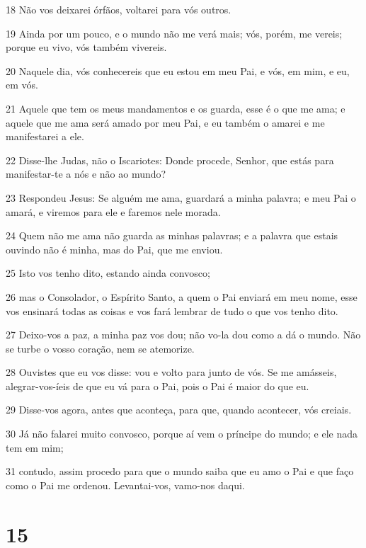 \par 18 Não vos deixarei órfãos, voltarei para vós outros.
\par 19 Ainda por um pouco, e o mundo não me verá mais; vós, porém, me vereis; porque eu vivo, vós também vivereis.
\par 20 Naquele dia, vós conhecereis que eu estou em meu Pai, e vós, em mim, e eu, em vós.
\par 21 Aquele que tem os meus mandamentos e os guarda, esse é o que me ama; e aquele que me ama será amado por meu Pai, e eu também o amarei e me manifestarei a ele.
\par 22 Disse-lhe Judas, não o Iscariotes: Donde procede, Senhor, que estás para manifestar-te a nós e não ao mundo?
\par 23 Respondeu Jesus: Se alguém me ama, guardará a minha palavra; e meu Pai o amará, e viremos para ele e faremos nele morada.
\par 24 Quem não me ama não guarda as minhas palavras; e a palavra que estais ouvindo não é minha, mas do Pai, que me enviou.
\par 25 Isto vos tenho dito, estando ainda convosco;
\par 26 mas o Consolador, o Espírito Santo, a quem o Pai enviará em meu nome, esse vos ensinará todas as coisas e vos fará lembrar de tudo o que vos tenho dito.
\par 27 Deixo-vos a paz, a minha paz vos dou; não vo-la dou como a dá o mundo. Não se turbe o vosso coração, nem se atemorize.
\par 28 Ouvistes que eu vos disse: vou e volto para junto de vós. Se me amásseis, alegrar-vos-íeis de que eu vá para o Pai, pois o Pai é maior do que eu.
\par 29 Disse-vos agora, antes que aconteça, para que, quando acontecer, vós creiais.
\par 30 Já não falarei muito convosco, porque aí vem o príncipe do mundo; e ele nada tem em mim;
\par 31 contudo, assim procedo para que o mundo saiba que eu amo o Pai e que faço como o Pai me ordenou. Levantai-vos, vamo-nos daqui.

\chapter{15}

